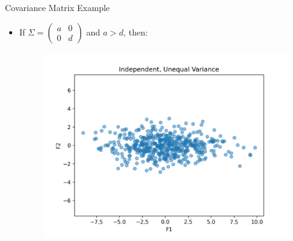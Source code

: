 \documentclass[serif, aspectratio=169]{beamer}
\begin{document}
\begin{frame}{Covariance Matrix Example}
    \begin{itemize}         
        \item If $\Sigma = 
\begin{pmatrix}
a & 0  \\
0 & d 
\end{pmatrix}$ and $a > d$, then:
        \begin{figure}[htpb]
            \begin{center}
         \includegraphics[keepaspectratio, scale=0.5]{pic/independent_unequal_variance.png}
            \end{center}
        \end{figure}
    \end{itemize}
\end{frame}
\end{document}
